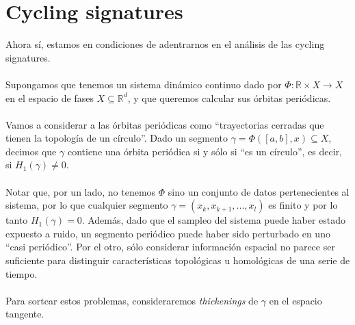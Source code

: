\documentclass[12pt,a4paper]{article}
\begin{document}
\section{Cycling signatures}
Ahora sí, estamos en condiciones de adentrarnos en el análisis de las cycling signatures.
\\
\\
Supongamos que tenemos un sistema dinámico continuo dado por $\Phi : \mathbb{R} \times X \rightarrow X$ en el espacio de fases $X \subseteq \mathbb{R}^d$, y que queremos calcular sus órbitas periódicas.
\\
\\
Vamos a considerar a las órbitas periódicas como ``trayectorias cerradas que tienen la topología de un círculo''. Dado un segmento $\gamma = \Phi([a,b],x) \subseteq X$, decimos que $\gamma$ contiene una órbita periódica si y sólo si ``es un círculo'', es decir, si $H_1(\gamma) \neq 0$.
\\
\\
Notar que, por un lado, no tenemos $\Phi$ sino un conjunto de datos pertenecientes al sistema, por lo que cualquier segmento $\gamma = (x_k,x_{k+1},...,x_l)$ es finito y por lo tanto $H_1(\gamma)=0$. Además, dado que el sampleo del sistema puede haber estado expuesto a ruido, un segmento periódico puede haber sido perturbado en uno ``casi periódico''. Por el otro, sólo considerar información espacial no parece ser suficiente para distinguir características topológicas u homológicas de una serie de tiempo.
\\
\\
Para sortear estos problemas, consideraremos \textit{thickenings} de $\gamma$ en el espacio tangente.
\end{document}
